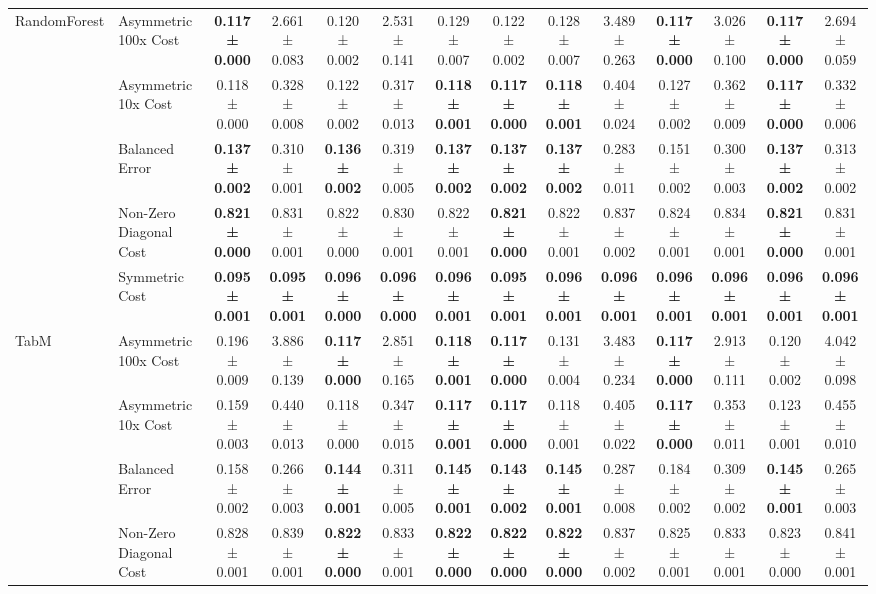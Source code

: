 \begin{table}[H]
{\begin{tabular}{llcccccccccccc}
\cline{1-14}
\multirow[t]{5}{*}{RandomForest} & Asymmetric 100x Cost & \textbf{0.117 ± 0.000} & 2.661 ± 0.083 & 0.120 ± 0.002 & 2.531 ± 0.141 & 0.129 ± 0.007 & 0.122 ± 0.002 & 0.128 ± 0.007 & 3.489 ± 0.263 & \textbf{0.117 ± 0.000} & 3.026 ± 0.100 & \textbf{0.117 ± 0.000} & 2.694 ± 0.059 \\
 & Asymmetric 10x Cost & 0.118 ± 0.000 & 0.328 ± 0.008 & 0.122 ± 0.002 & 0.317 ± 0.013 & \textbf{0.118 ± 0.001} & \textbf{0.117 ± 0.000} & \textbf{0.118 ± 0.001} & 0.404 ± 0.024 & 0.127 ± 0.002 & 0.362 ± 0.009 & \textbf{0.117 ± 0.000} & 0.332 ± 0.006 \\
 & Balanced Error & \textbf{0.137 ± 0.002} & 0.310 ± 0.001 & \textbf{0.136 ± 0.002} & 0.319 ± 0.005 & \textbf{0.137 ± 0.002} & \textbf{0.137 ± 0.002} & \textbf{0.137 ± 0.002} & 0.283 ± 0.011 & 0.151 ± 0.002 & 0.300 ± 0.003 & \textbf{0.137 ± 0.002} & 0.313 ± 0.002 \\
 & Non-Zero Diagonal Cost & \textbf{0.821 ± 0.000} & 0.831 ± 0.001 & 0.822 ± 0.000 & 0.830 ± 0.001 & 0.822 ± 0.001 & \textbf{0.821 ± 0.000} & 0.822 ± 0.001 & 0.837 ± 0.002 & 0.824 ± 0.001 & 0.834 ± 0.001 & \textbf{0.821 ± 0.000} & 0.831 ± 0.001 \\
 & Symmetric Cost & \textbf{0.095 ± 0.001} & \textbf{0.095 ± 0.001} & \textbf{0.096 ± 0.000} & \textbf{0.096 ± 0.000} & \textbf{0.096 ± 0.001} & \textbf{0.095 ± 0.001} & \textbf{0.096 ± 0.001} & \textbf{0.096 ± 0.001} & \textbf{0.096 ± 0.001} & \textbf{0.096 ± 0.001} & \textbf{0.096 ± 0.001} & \textbf{0.096 ± 0.001} \\
\cline{1-14}
\multirow[t]{5}{*}{TabM} & Asymmetric 100x Cost & 0.196 ± 0.009 & 3.886 ± 0.139 & \textbf{0.117 ± 0.000} & 2.851 ± 0.165 & \textbf{0.118 ± 0.001} & \textbf{0.117 ± 0.000} & 0.131 ± 0.004 & 3.483 ± 0.234 & \textbf{0.117 ± 0.000} & 2.913 ± 0.111 & 0.120 ± 0.002 & 4.042 ± 0.098 \\
 & Asymmetric 10x Cost & 0.159 ± 0.003 & 0.440 ± 0.013 & 0.118 ± 0.000 & 0.347 ± 0.015 & \textbf{0.117 ± 0.001} & \textbf{0.117 ± 0.000} & 0.118 ± 0.001 & 0.405 ± 0.022 & \textbf{0.117 ± 0.000} & 0.353 ± 0.011 & 0.123 ± 0.001 & 0.455 ± 0.010 \\
 & Balanced Error & 0.158 ± 0.002 & 0.266 ± 0.003 & \textbf{0.144 ± 0.001} & 0.311 ± 0.005 & \textbf{0.145 ± 0.001} & \textbf{0.143 ± 0.002} & \textbf{0.145 ± 0.001} & 0.287 ± 0.008 & 0.184 ± 0.002 & 0.309 ± 0.002 & \textbf{0.145 ± 0.001} & 0.265 ± 0.003 \\
 & Non-Zero Diagonal Cost & 0.828 ± 0.001 & 0.839 ± 0.001 & \textbf{0.822 ± 0.000} & 0.833 ± 0.001 & \textbf{0.822 ± 0.000} & \textbf{0.822 ± 0.000} & \textbf{0.822 ± 0.000} & 0.837 ± 0.002 & 0.825 ± 0.001 & 0.833 ± 0.001 & 0.823 ± 0.000 & 0.841 ± 0.001 \\

\end{tabular}}
\end{table}
